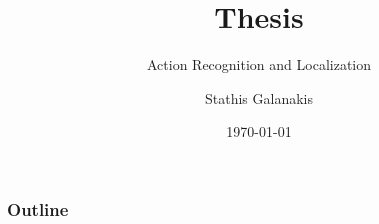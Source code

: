 \documentclass{beamer}
\title{Thesis}
\subtitle{Action Recognition and Localization}
\author{Stathis Galanakis}
\institute{National University of Athens}
\date{\today}
\begin{document}
\begin{frame}
\titlepage
\end{frame}

\begin{frame}
  \frametitle{Outline}
  \tableofcontents[pausesections]
\end{frame}






\end{document}
